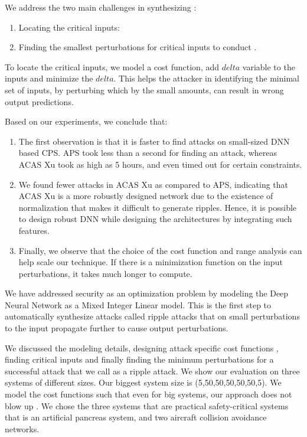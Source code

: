 We address the two main challenges in synthesizing \attack: 
\begin{enumerate}
	\item Locating the critical inputs: 
	
	\item Finding the smallest perturbations for critical inputs to conduct \attack.
	
\end{enumerate}

To locate the critical inputs, we model a cost function,  add $delta$ variable to the inputs and minimize the $delta$. 
This helps the attacker in identifying the minimal set of inputs, by perturbing which by the small amounts, can result in wrong output predictions. 

Based on our experiments, we conclude that:

\begin{enumerate}
	\item The first observation is that it is faster to find attacks on small-sized DNN based CPS. 
	APS took less than a second for finding an attack, whereas ACAS Xu took as high as 5 hours, and even timed out for certain constraints. 
	
	\item We found fewer attacks in ACAS Xu as compared to APS, indicating  that ACAS Xu is a more robustly designed network due to the existence of normalization that makes it difficult to generate ripples. 
	Hence, it is possible to design robust \ac{DNN} while designing the architectures by integrating such features. 
	
	\item Finally, we observe that the choice of the cost function and range analysis can help scale our technique. 
	If there is a minimization function on the input perturbations, it takes much longer to compute.
\end{enumerate}




\iffalse
We have addressed security as an optimization problem by modeling the Deep Neural Network as a Mixed Integer Linear model. This is the first step to automatically synthesize attacks called ripple attacks that on small perturbations to the input propagate further to cause output perturbations. 

We discussed the modeling details, designing attack specific cost functions , finding critical inputs and finally finding the minimum perturbations for a successful attack that we call as a ripple attack. We show our evaluation on three systems of different sizes. Our biggest system size is (5,50,50,50,50,50,5). We model the cost functions such that even for big systems, our approach does not blow up . We chose the three systems that are practical safety-critical systems that is an artificial pancreas system, and two aircraft collision avoidance networks.

